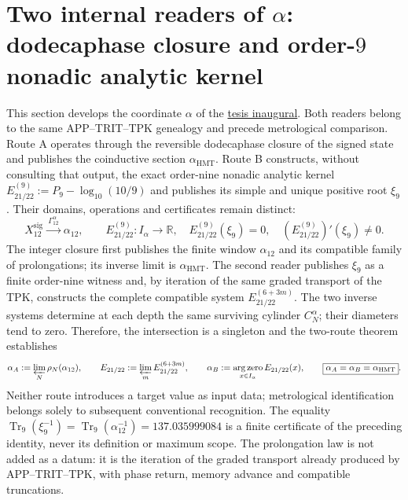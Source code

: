 
\section{Two internal readers of \texorpdfstring{\(\alpha\)}{alpha}: dodecaphase closure and order-\texorpdfstring{\(9\)}{9} nonadic analytic kernel}
\label{sec:l9s102:alpha-dos-vias}

This section develops the coordinate \(\alpha\) of the
\hyperref[sec:tesis-inaugural-helicoidal-hmt-md]{tesis inaugural}. Both
readers belong to the same APP--TRIT--TPK genealogy and precede
metrological comparison. Route A operates through the reversible dodecaphase
closure of the signed state and publishes the coinductive section
\(\alpha_{\mathrm{HMT}}\). Route B constructs, without consulting that output, the
exact order-nine nonadic analytic kernel
\(E_{21/22}^{(9)}:=P_9-\log_{10}(10/9)\) and publishes its simple and unique positive
root \(\xi_9\). Their domains, operations and certificates remain
distinct:
\begin{equation}
 X_{12}^{\mathrm{sig}}
 \xrightarrow{\ \Gamma_{12}^{\alpha}\ }
 \alpha_{12},
 \qquad
 E_{21/22}^{(9)}:I_\alpha\longrightarrow\mathbb R,
 \quad E_{21/22}^{(9)}(\xi_9)=0,
 \quad (E_{21/22}^{(9)})'(\xi_9)\ne0.
 \label{eq:l9s102:alpha-dos-mapas}
\end{equation}
The integer closure first publishes the finite window \(\alpha_{12}\) and its
compatible family of prolongations; its inverse limit is
\(\alpha_{\mathrm{HMT}}\). The second reader publishes \(\xi_9\) as a finite
order-nine witness and, by iteration of the same graded transport of the TPK,
constructs the complete compatible system
\(E_{21/22}^{(6+3m)}\). The two inverse systems determine at each
depth the same surviving cylinder \(C_N^\alpha\); their diameters
tend to zero. Therefore, the intersection is a singleton and the two-route
theorem establishes
\begin{equation}
 \alpha_A:=\varprojlim_N\rho_N(\alpha_{12}),
 \qquad
 E_{21/22}:=\varprojlim_m E_{21/22}^{(6+3m)},
 \qquad
 \alpha_B:=\operatorname*{arg\,zero}_{x\in I_\alpha}E_{21/22}(x),
 \qquad
 \boxed{\alpha_A=\alpha_B=\alpha_{\mathrm{HMT}}}.
 \label{eq:l9s102:alpha-identidad-limite-dos-vias}
\end{equation}
Neither route introduces a target value as input data;
metrological identification belongs solely to subsequent conventional
recognition. The equality
\(\operatorname{Tr}_9(\xi_9^{-1})=
\operatorname{Tr}_9(\alpha_{12}^{-1})=137.035999084\) is a finite
certificate of the preceding identity, never its definition or maximum scope.
The prolongation law is not added as a datum: it is the iteration of the graded
transport already produced by APP--TRIT--TPK, with phase return, memory
advance and compatible truncations.

